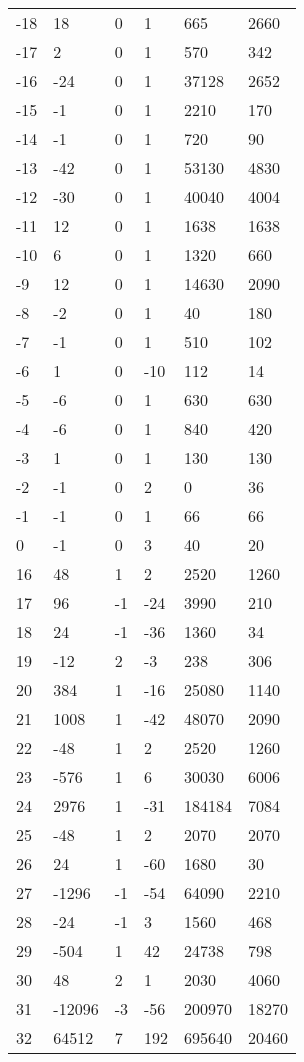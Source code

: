 \documentclass{amsart}
\begin{document}
\begin{longtable}{llllll}
-18 & 18 & 0 & 1 & 665 & 2660\\
-17 & 2 & 0 & 1 & 570 & 342\\
-16 & -24 & 0 & 1 & 37128 & 2652\\
-15 & -1 & 0 & 1 & 2210 & 170\\
-14 & -1 & 0 & 1 & 720 & 90\\
-13 & -42 & 0 & 1 & 53130 & 4830\\
-12 & -30 & 0 & 1 & 40040 & 4004\\
-11 & 12 & 0 & 1 & 1638 & 1638\\
-10 & 6 & 0 & 1 & 1320 & 660\\
-9 & 12 & 0 & 1 & 14630 & 2090\\
-8 & -2 & 0 & 1 & 40 & 180\\
-7 & -1 & 0 & 1 & 510 & 102\\
-6 & 1 & 0 & -10 & 112 & 14\\
-5 & -6 & 0 & 1 & 630 & 630\\
-4 & -6 & 0 & 1 & 840 & 420\\
-3 & 1 & 0 & 1 & 130 & 130\\
-2 & -1 & 0 & 2 & 0 & 36\\
-1 & -1 & 0 & 1 & 66 & 66\\
0 & -1 & 0 & 3 & 40 & 20\\
16 & 48 & 1 & 2 & 2520 & 1260\\
17 & 96 & -1 & -24 & 3990 & 210\\
18 & 24 & -1 & -36 & 1360 & 34\\
19 & -12 & 2 & -3 & 238 & 306\\
20 & 384 & 1 & -16 & 25080 & 1140\\
21 & 1008 & 1 & -42 & 48070 & 2090\\
22 & -48 & 1 & 2 & 2520 & 1260\\
23 & -576 & 1 & 6 & 30030 & 6006\\
24 & 2976 & 1 & -31 & 184184 & 7084\\
25 & -48 & 1 & 2 & 2070 & 2070\\
26 & 24 & 1 & -60 & 1680 & 30\\
27 & -1296 & -1 & -54 & 64090 & 2210\\
28 & -24 & -1 & 3 & 1560 & 468\\
29 & -504 & 1 & 42 & 24738 & 798\\
30 & 48 & 2 & 1 & 2030 & 4060\\
31 & -12096 & -3 & -56 & 200970 & 18270\\
32 & 64512 & 7 & 192 & 695640 & 20460\\

\end{longtable}
\end{document}
